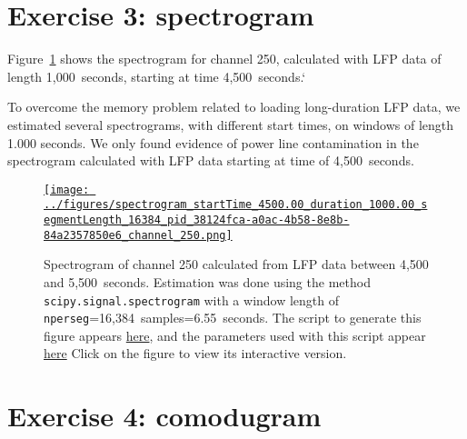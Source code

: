 \documentclass[12pt]{article}
\begin{document}
\section*{Exercise 3: spectrogram}

Figure~\ref{fig:spectrogramChannel250} shows the spectrogram for channel 250,
calculated with LFP data of length 1,000~seconds, starting at time 4,500~seconds.`

To overcome the memory problem related to loading long-duration LFP data, we
estimated several spectrograms, with different start times, on windows of
length 1.000 seconds. We only found evidence of power line contamination in the
spectrogram calculated with LFP data starting at time of 4,500~seconds.

\begin{figure}[H]
    \begin{center}
        \href{https://www.gatsby.ucl.ac.uk/~rapela/neuroinformatics/2023/ws3/figures/spectrogram_startTime_4500.00_duration_1000.00_segmentLength_16384_pid_38124fca-a0ac-4b58-8e8b-84a2357850e6_channel_250.html}{\texttt{[image: ../figures/spectrogram\_startTime\_4500.00\_duration\_1000.00\_segmentLength\_16384\_pid\_38124fca-a0ac-4b58-8e8b-84a2357850e6\_channel\_250.png]}}



        \caption{Spectrogram of channel 250 calculated from LFP data between
        4,500 and 5,500~seconds. Estimation was done
        using the method \texttt{scipy.signal.spectrogram} with a window length
        of \texttt{nperseg}=16,384~samples=6.55~seconds.
        The script to generate this figure appears
        \href{https://github.com/joacorapela/neuroinformatics23/blob/master/worksheets/ws3/mySolution/code/scripts/doComputeAndPlotSpectrogram.py}{here},
        and the parameters used with this script appear
        \href{https://github.com/joacorapela/neuroinformatics23/blob/master/worksheets/ws3/mySolution/code/scripts/doComputeAndPlotSpectrogram.csh}{here}
        Click on the figure to view its interactive version.  }

                \label{fig:spectrogramChannel250}

            \end{center}
        \end{figure}

\section*{Exercise 4: comodugram}
\end{document}
